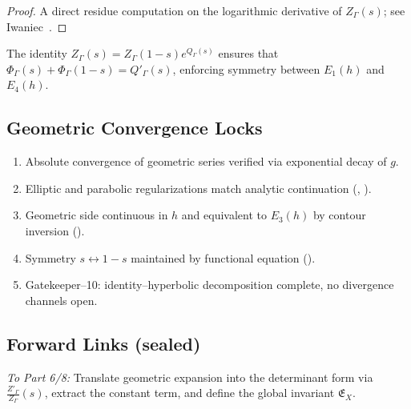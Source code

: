 \begin{proof}\relax
A direct residue computation on the logarithmic derivative of $Z_\Gamma(s)$; see Iwaniec~\cite{Iwaniec2002}. %
\end{proof}

\begin{remark}\label{rem:FE-sym}\relax
The identity $Z_\Gamma(s)=Z_\Gamma(1-s)e^{Q_\Gamma(s)}$ ensures that $\Phi_\Gamma(s)+\Phi_\Gamma(1-s)=Q'_\Gamma(s)$, enforcing symmetry between $E_1(h)$ and $E_4(h)$. %
\end{remark}

\subsection{Geometric Convergence Locks}\relax\hspace{0pt}
\label{subsec:geom-locks}\relax\hspace{0pt}

\begin{tcolorbox}[colback=gray!3,colframe=gray!50,title={Compliance Check • Part 5/8}] %
\begin{enumerate}[(C10)]
  \item Absolute convergence of geometric series verified via exponential decay of $g$. %
  \item Elliptic and parabolic regularizations match analytic continuation (, ). %
  \item Geometric side continuous in $h$ and equivalent to $E_3(h)$ by contour inversion (). %
  \item Symmetry $s\leftrightarrow 1-s$ maintained by functional equation (). %
  \item Gatekeeper–10: identity–hyperbolic decomposition complete, no divergence channels open. %
\end{enumerate}
\end{tcolorbox}

\subsection*{Forward Links (sealed)}\relax\hspace{0pt}
\noindent
\emph{To Part 6/8:} Translate geometric expansion into the determinant form via $\frac{Z'_\Gamma}{Z_\Gamma}(s)$, extract the constant term, and define the global invariant $\mathfrak{E}_X$.\relax\hspace{0pt} %


